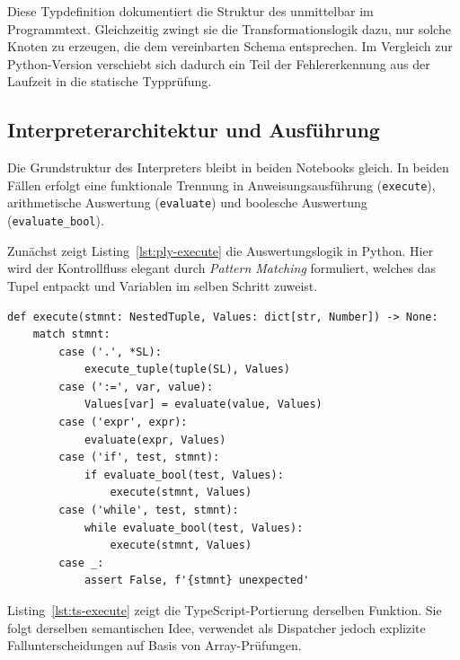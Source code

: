 Diese Typdefinition dokumentiert die Struktur des  unmittelbar im Programmtext. Gleichzeitig zwingt sie die Transformationslogik dazu, nur solche Knoten zu erzeugen, die dem vereinbarten Schema entsprechen. Im Vergleich zur Python-Version verschiebt sich dadurch ein Teil der Fehlererkennung aus der Laufzeit in die statische Typprüfung.

\subsection{Interpreterarchitektur und Ausführung}

Die Grundstruktur des Interpreters bleibt in beiden Notebooks gleich. In beiden Fällen erfolgt eine funktionale Trennung in Anweisungsausführung (\texttt{execute}), arithmetische Auswertung (\texttt{evaluate}) und boolesche Auswertung (\texttt{evaluate\_bool}).

Zunächst zeigt Listing~\ref{lst:ply-execute} die Auswertungslogik in Python. Hier wird der Kontrollfluss elegant durch \textit{Pattern Matching} formuliert, welches das Tupel entpackt und Variablen im selben Schritt zuweist.

\begin{listing}[htbp]
\caption{Ausführung von Anweisungen in Python}
\label{lst:ply-execute}
\begin{verbatim}
def execute(stmnt: NestedTuple, Values: dict[str, Number]) -> None:
    match stmnt:
        case ('.', *SL):
            execute_tuple(tuple(SL), Values)
        case (':=', var, value):
            Values[var] = evaluate(value, Values)
        case ('expr', expr):
            evaluate(expr, Values)
        case ('if', test, stmnt):
            if evaluate_bool(test, Values):
                execute(stmnt, Values)
        case ('while', test, stmnt):
            while evaluate_bool(test, Values):
                execute(stmnt, Values)
        case _:
            assert False, f'{stmnt} unexpected'
\end{verbatim}
\end{listing}

Listing~\ref{lst:ts-execute} zeigt die TypeScript-Portierung derselben Funktion. Sie folgt derselben semantischen Idee, verwendet als Dispatcher jedoch explizite Fallunterscheidungen auf Basis von Array-Prüfungen.

